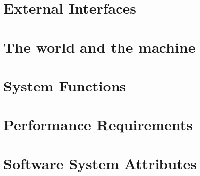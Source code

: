 \section{External Interfaces}
	
\section{The world and the machine}
	
\section{System Functions}
	\label{sec:system_functions}
	
\section{Performance Requirements}
	
\section{Software System Attributes}
	